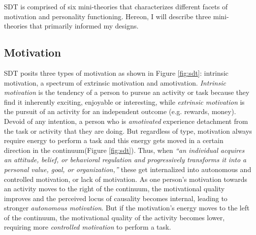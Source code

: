 SDT is comprised of six mini-theories that characterizes different facets of motivation and personality functioning. Hereon, I will describe three mini-theories that primarily informed my designs. 

\subsection{Motivation}
SDT posits three types of motivation as shown in Figure \ref{fig:sdt}: intrinsic motivation, a spectrum of extrinsic motivation and amotivation. \textit{Intrinsic motivation} is the tendency of a person to pursue an activity or task because they find it inherently exciting, enjoyable or interesting, while \textit{extrinsic motivation} is the pursuit of an activity for an independent outcome (e.g. rewards, money). Devoid of any intention, a person who is \textit{amotivated} experience detachment from the task or activity that they are doing. But regardless of type, motivation always require energy to perform a task and this energy gets moved in a certain direction in the continuum\cite{deci2000and}(Figure \ref{fig:sdt}). Thus, when \textit{``an individual acquires an attitude, belief, or behavioral regulation and progressively transforms it into a personal value, goal, or organization,''}\cite{ryan2000intrinsic} these get internalized into autonomous and controlled motivation, or lack of motivation. As one person's motivation towards an activity moves to the right of the continuum, the motivational quality improves and the perceived locus of causality becomes internal, leading to stronger \textit{autonomous motivation}. But if the motivation's energy moves to the left of the continuum, the motivational quality of the activity becomes lower, requiring more \textit{controlled motivation} to perform a task. 

